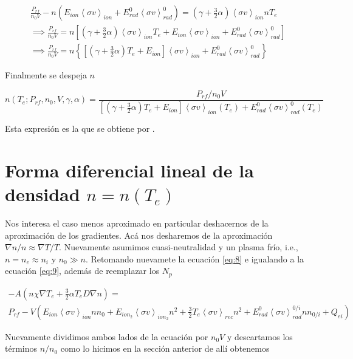 \documentclass[11pt]{article}
\theoremstyle{definition}
\begin{document}
  \begin{eqnarray*}
    \frac{P_{rf}}{n_0V} -n (E_{ion}\left<\sigma v\right>_{ion} + E_{rad}^0\left<\sigma v\right>_{rad}^0) = \left(\gamma + \frac{3}{2}\alpha\right)\left<\sigma v\right>_{ion}nT_e \\ \implies \frac{P_{rf}}{n_0V} = n \left[\left(\gamma + \frac{3}{2}\alpha\right)\left<\sigma v\right>_{ion}T_e + E_{ion}\left<\sigma v\right>_{ion} + E_{rad}^0\left<\sigma v\right>_{rad}^0\right] \\
    \implies \frac{ P_{rf} }{n_0V} = n \left\{ \left[ \left(\gamma + \frac{3}{2}\alpha\right)T_e + E_{ion}\right] \left<\sigma v\right>_{ion} + E_{rad}^0\left<\sigma v\right>_{rad}^0 \right\}
  \end{eqnarray*}

  Finalmente se despeja $n$

  \begin{equation}
    n(T_e; P_{rf}, n_0, V, \gamma, \alpha) = \frac{P_{rf}/n_0V}{\left[ \left(\gamma + \frac{3}{2}\alpha\right)T_e + E_{ion}\right] \left<\sigma v\right>_{ion}(T_e) + E_{rad}^0\left<\sigma v\right>_{rad}^0(T_e)}
  \end{equation}

  Esta expresi\'on es la que se obtiene por \cite{lechte2002}.

  \section{Forma diferencial lineal de la densidad $n = n(T_e)$}
  Nos interesa el caso menos aproximado en particular deshacernos de la aproximaci\'on de los gradientes. Ac\'a nos desharemos de la aproximaci\'on $\nabla n /n \approx \nabla T /T$. Nuevamente asumimos cuasi-neutralidad y un plasma fr\'io, i.e., $n = n_e \approx n_i$ y $n_0 \gg n$. Retomando nuevamete la ecuaci\'on \eqref{eq:8} e igualando a la ecuaci\'on \eqref{eq:9}, adem\'as de reemplazar los $N_p$

  \begin{eqnarray*}
    -A\left(n\chi\nabla T_e + \frac{3}{2}\alpha T_e D\nabla n\right) = \\ P_{rf} - V\left(E_{ion}\left<\sigma v\right>_{ion}nn_0 + E_{ion_2}\left<\sigma v\right>_{ion_2}n^2 + \frac{3}{2}T_e\left<\sigma v\right>_{rec}n^2 + E_{rad}^0\left<\sigma v\right>_{rad}^{0/i}n n_{0/i} + Q_{ei}\right) 
  \end{eqnarray*}

  Nuevamente dividimos ambos lados de la ecuaci\'on por $n_0 V$ y descartamos los t\'erminos $n/n_0$ como lo hicimos en la secci\'on anterior de all\'i obtenemos
\end{document}
